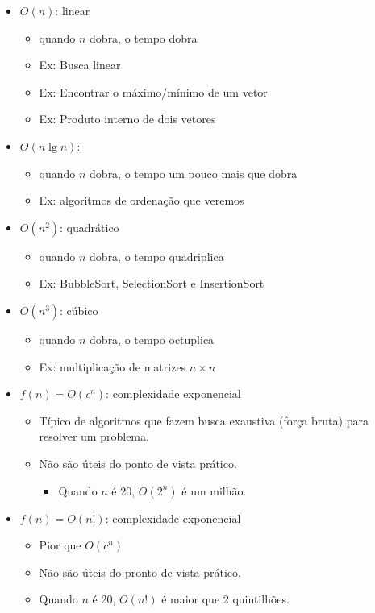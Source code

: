 \begin{itemize}
  \item $O(n)$: linear
  \begin{itemize}
    \item quando $n$ dobra, o tempo dobra
    \item Ex: Busca linear
    \item Ex: Encontrar o máximo/mínimo de um vetor
    \item Ex: Produto interno de dois vetores
  \end{itemize}\medskip
  \item $O(n \lg n)$:
  \begin{itemize}
    \item quando $n$ dobra, o tempo um pouco mais que dobra
    \item Ex: algoritmos de ordenação que veremos
  \end{itemize}\medskip
  \item $O(n^2)$: quadrático
  \begin{itemize}
    \item quando $n$ dobra, o tempo quadriplica
    \item Ex: BubbleSort, SelectionSort e InsertionSort
  \end{itemize}\medskip
  \item $O(n^3)$: cúbico
  \begin{itemize}
    \item quando $n$ dobra, o tempo octuplica
    \item Ex: multiplicação de matrizes $n \times n$
  \end{itemize}
  
  \item $f(n) = O(c^n)$: complexidade exponencial
  \begin{itemize}
  \itemsep1em
  \item Típico de algoritmos que fazem busca exaustiva (força bruta) para resolver um problema.
  \item Não são úteis do ponto de vista prático.
  \begin{itemize}
   \item Quando $n$ é 20, $O(2^n)$ é um milhão.
  \end{itemize}
  \end{itemize}
  
  
  \item $f(n) = O(n!)$: complexidade exponencial
  \begin{itemize}
  \itemsep1em
  \item Pior que $O(c^n)$
  \item Não são úteis do pronto de vista prático.
  \item Quando $n$ é 20, $O(n!)$ é maior que 2 quintilhões.
  \end{itemize}
  
\end{itemize}


